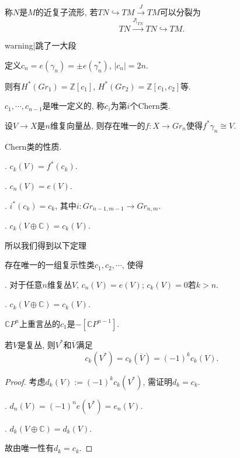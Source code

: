 \begin{definition}
    称$N$是$M$的近复子流形, 若$TN \hookrightarrow TM \stackrel{J}{\longrightarrow} TM$可以分裂为
    $$TN \stackrel{J|_{TN}}{\longrightarrow} TN \hookrightarrow TM.$$
\end{definition}


{{warning|跳了一大段}}

\begin{definition}
    定义$c_n = e(\gamma_n) = \pm e(\gamma_n^*)$, $\vert c_n \vert =2n$.
\end{definition}

\quad 则有$H^*(Gr_1) = \mathbb{Z} [c_1]$, $H^*(Gr_2)= \mathbb{Z}[c_1, c_2]$等.

\begin{proposition}
    $c_1, \cdots, c_{n-1}$是唯一定义的, 称$c_i$为第$i$个Chern类.
\end{proposition}

\quad 设$V\rightarrow X$是$n$维复向量丛, 
则存在唯一的$f: X \rightarrow Gr_n$使得$f^*\gamma_n \cong V$.

\begin{proposition} Chern类的性质.

    . $c_k(V) = f^*(c_k)$.

    . $c_n(V) = e(V)$.

    . $i^*(c_k)=c_k$, 其中$i: Gr_{n-1, m-1} \rightarrow Gr_{n, m}$.

    . $c_k(V\oplus \mathbb{C}) = c_k(V)$.
\end{proposition}

\quad 所以我们得到以下定理

\begin{theorem}
    存在唯一的一组复示性类$c_1, c_2, \cdots$, 使得

    . 对于任意$n$维复丛$V$, $c_n(V) = e(V)$; $c_k(V)=0$若$k>n$.

    . $c_k(V \oplus \mathbb{C}) = c_k(V)$.
\end{theorem}

\begin{proposition}
    $\mathbb{C}P^n$上重言丛的$c_1$是$-[\mathbb{C}P^{n-1}]$.
\end{proposition}

\begin{proposition}
    若$V$是复丛, 则$V^*$和$\overline{V}$满足
        $$c_k(V^*) = c_k(\overline{V}) = (-1)^k c_k(V).$$
\end{proposition}
\begin{proof}
    考虑$d_k(V) :=(-1)^k c_k(V^*)$, 需证明$d_k=c_k$.

    . $d_n(V) = (-1)^n e(V^*) = e_n(V)$.

    . $d_k(V \oplus \mathbb{C})=d_k(V)$.

    \quad 故由唯一性有$d_k=c_k$.
\end{proof}

